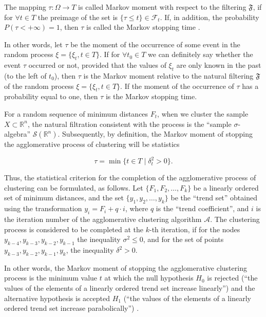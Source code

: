 The mapping \(\tau: \Omega \longrightarrow T\) is called Markov moment with respect to the filtering $\mathfrak{F}$, if for \(\forall t \in T\) the preimage of the set is \(\{\tau \le t\} \in \mathcal{F}_t\). If, in addition, the probability \(P(\tau < +\infty) = 1\), then $\tau$ is called the Markov stopping time \cite{Sirjaev}.

In other words, let $\tau$ be the moment of the occurrence of some event in the random process \(\xi = \{\xi_t, t \in T\}\). If for \(\forall t_0 \in T\) we can definitely say whether the event $\tau$ occurred or not, provided that the values of \(\xi_t\) are only known in the past (to the left of \(t_0\)), then $\tau$ is the Markov moment relative to the natural filtering $\mathfrak{F}$ of the random process \(\xi = \{\xi_t, t \in T\}\). If the moment of the occurrence of $\tau$ has a probability equal to one, then $\tau$ is the Markov stopping time.

For a random sequence of minimum distances \(F_t\), when we cluster the sample \(X \subset \mathbb{R}^n\), the natural filtration consistent with the process is the “sample $\sigma$-algebra” \(\mathcal{S}(\mathbb{R}^n)\). Subsequently, by definition, the Markov moment of stopping the agglomerative process of clustering will be statistics

\begin{equation}
	\label{eqn:49}
	\tau = \min\{t \in T \mid \delta_t^2 > 0\}.
\end{equation}

Thus, the statistical criterion for the completion of the agglomerative process of clustering can be formulated, as follows. Let \(\{F_1, F_2,\ldots, F_k\}\) be a linearly ordered set of minimum distances, and the set \(\{y_1, y_2, \ldots, y_k\}\) be the “trend set” obtained using the transformation \(y_i = F_i + q \cdot i\), where \(q\) is the “trend coefficient”, and \(i\) is the iteration number of the agglomerative clustering algorithm \(\mathcal{A}\). The clustering process is considered to be completed at the \(k\)-th iteration, if for the nodes \(y_{k-4}, y_{k-3}, y_{k-2}, y_{k-1}\) the inequality \(\sigma^2 \le 0\), and for the set of points \(y_{k-3}, y_{k-2}, y_{k-1}, y_k\), the inequality \(\delta^2 > 0\).

In other words, the Markov moment of stopping the agglomerative clustering process is the minimum value \(t\) at which the null hypothesis \(H_0\) is rejected (“the values of the elements of a linearly ordered trend set increase linearly”) and the alternative hypothesis is accepted \(H_1\) (“the values of the elements of a linearly ordered trend set increase parabolically”) \cite{Orekhov}.


